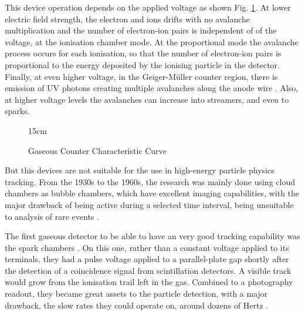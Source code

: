 This device operation depends on the applied voltage as shown Fig. \ref{fig:gaseous_curve}. At lower electric field strength, the electron and ions drifts with no avalanche multiplication and the number of electron-ion pairs is independent of of the voltage, at the ionisation chamber mode. At the proportional mode the avalanche process occurs for each ionisation, so that the number of electron-ion pairs is proportional to the energy deposited by the ionising particle in the detector. Finally, at even higher voltage, in the Geiger-Müller counter region, there is emission of UV photons creating multiple avalanches along the anode wire \cite{o1961detection}. Also, at higher voltage levels the avalanches can increase into streamers, and even to sparks.

\begin{figure}[!htm]{15cm} %
\caption{Gaseous Counter Characteristic Curve}%
\label{fig:gaseous_curve}
\end{figure}

But this devices are not suitable for the use in high-energy particle physics tracking. From the 1930s to the 1960s, the research was mainly done using cloud chambers as bubble chambers, which have excellent imaging capabilities, with the major drawback of being active during a selected time interval, being unsuitable to analysis of rare events \cite{sauli2015gaseous}.

The first gaseous detector to be able to have an very good tracking capability was the spark chambers \cite{fukui1959new}. On this one, rather than a constant voltage applied to its terminals, they had a pulse voltage applied to a parallel-plate gap shortly after the detection of a coincidence signal from scintillation detectors. A visible track would grow from the ionisation trail left in the gas. Combined to a photography readout, they became great assets to the particle detection, with a major drawback, the slow rates they could operate on, around dozens of Hertz \cite{sauli2015gaseous}.

